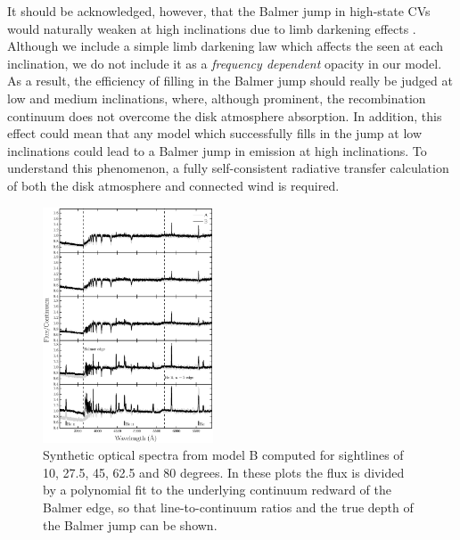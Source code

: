 \documentclass[preprint, a4paper, 11pt]{aastex}
\begin{document}
It should be acknowledged, however,
that the Balmer jump in high-state CVs would naturally weaken at
high inclinations due to limb darkening effects \citep{ladous1989, ladous1989b}. 
Although we include a simple limb darkening law which affects 
the seen at each inclination, we do not
include it as a {\em frequency dependent} opacity in our model.
As a result, the efficiency of filling in the Balmer jump
should really be judged at low and medium inclinations, 
where, although prominent, the recombination continuum does
not overcome the disk atmosphere absorption. 
In addition, this effect 
could mean that any model which successfully fills in the 
jump at low inclinations could lead to a Balmer jump 
in emission at high inclinations.
To understand this phenomenon, a fully self-consistent
radiative transfer calculation of both the disk atmosphere
and connected wind is required.

\begin{figure} 
\includegraphics[width=0.45\textwidth]{figures/modelb_opt_cont.eps}
\caption{
Synthetic optical spectra from model B computed for 
sightlines of 10, 27.5, 45, 62.5 and 80 degrees. In these plots
the flux is divided by a polynomial fit to the 
underlying continuum redward of the Balmer edge, so that 
line-to-continuum ratios and the true depth of the
Balmer jump can be shown.
}
\label{continuumb}
\end{figure} 
\end{document}
